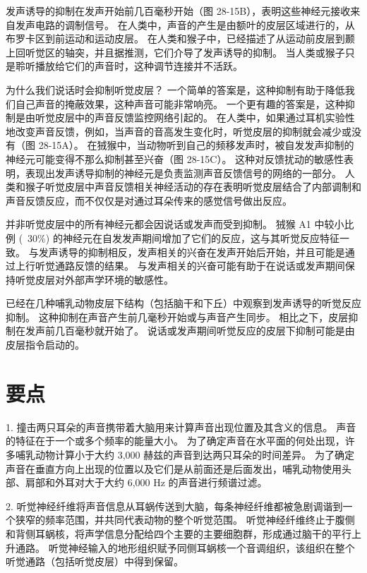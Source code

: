 发声诱导的抑制在发声开始前几百毫秒开始（图 28-15B），表明这些神经元接收来自发声电路的调制信号。 在人类中，声音的产生是由额叶的皮层区域进行的，从布罗卡区到前运动和运动皮层。 在人类和猴子中，已经描述了从运动前皮层到颞上回听觉区的轴突，并且据推测，它们介导了发声诱导的抑制。 当人类或猴子只是聆听播放给它们的声音时，这种调节连接并不活跃。

为什么我们说话时会抑制听觉皮层？ 一个简单的答案是，这种抑制有助于降低我们自己声音的掩蔽效果，这种声音可能非常响亮。 一个更有趣的答案是，这种抑制是由听觉皮层中的声音反馈监控网络引起的。 在人类中，如果通过耳机实验性地改变声音反馈，例如，当声音的音高发生变化时，听觉皮层的抑制就会减少或没有（图 28-15A）。 在狨猴中，当动物听到自己的频移发声时，被自发发声抑制的神经元可能变得不那么抑制甚至兴奋（图 28-15C）。 这种对反馈扰动的敏感性表明，表现出发声诱导抑制的神经元是负责监测声音反馈信号的网络的一部分。 人类和猴子听觉皮层中声音反馈相关神经活动的存在表明听觉皮层结合了内部调制和声音反馈反应，而不仅仅是对通过耳朵传来的感觉信号做出反应。

并非听觉皮层中的所有神经元都会因说话或发声而受到抑制。 狨猴 A1 中较小比例 (~30\%) 的神经元在自发发声期间增加了它们的反应，这与其听觉反应特征一致。 与发声诱导的抑制相反，发声相关的兴奋在发声开始后开始，并且可能是通过上行听觉通路反馈的结果。 与发声相关的兴奋可能有助于在说话或发声期间保持听觉皮层对外部声学环境的敏感性。

已经在几种哺乳动物皮层下结构（包括脑干和下丘）中观察到发声诱导的听觉反应抑制。 这种抑制在声音产生前几毫秒开始或与声音产生同步。 相比之下，皮层抑制在发声前几百毫秒就开始了。 说话或发声期间听觉反应的皮层下抑制可能是由皮层指令启动的。


\section{要点}
1. 撞击两只耳朵的声音携带着大脑用来计算声音出现位置及其含义的信息。 声音的特征在于一个或多个频率的能量大小。 为了确定声音在水平面的何处出现，许多哺乳动物计算小于大约 3,000 赫兹的声音到达两只耳朵的时间差异。 为了确定声音在垂直方向上出现的位置以及它们是从前面还是后面发出，哺乳动物使用头部、肩部和外耳对大于大约 6,000 Hz 的声音进行频谱过滤。 

2. 听觉神经纤维将声音信息从耳蜗传送到大脑，每条神经纤维都被急剧调谐到一个狭窄的频率范围，并共同代表动物的整个听觉范围。 听觉神经纤维终止于腹侧和背侧耳蜗核，将声学信息分配给四个主要的主要细胞群，形成通过脑干的平行上升通路。 听觉神经输入的地形组织赋予同侧耳蜗核一个音调组织，该组织在整个听觉通路（包括听觉皮层）中得到保留。 

